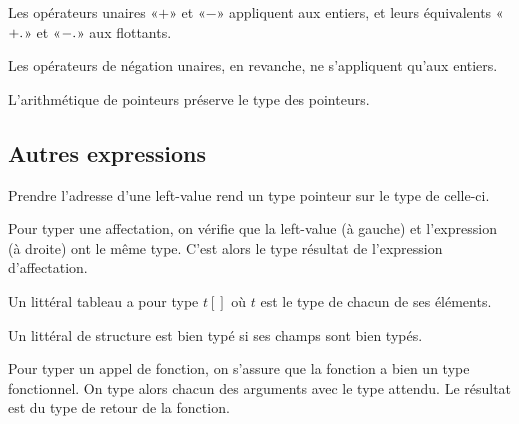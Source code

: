 Les opérateurs unaires «$+$» et «$-$» appliquent aux entiers, et leurs
équivalents «$\floatop{+}$» et «$\floatop{-}$» aux flottants.


Les opérateurs de négation unaires, en revanche, ne s'appliquent qu'aux
entiers.

\begin{mathpar}
\end{mathpar}

L'arithmétique de pointeurs préserve le type des pointeurs.

\begin{mathpar}
\end{mathpar}

\subsection*{Autres expressions}

Prendre l'adresse d'une left-value rend un type pointeur sur le type de
celle-ci.

\begin{mathpar}
\end{mathpar}

Pour typer une affectation, on vérifie que la left-value (à gauche) et
l'expression (à droite) ont le même type. C'est alors le type résultat de
l'expression d'affectation.

\begin{mathpar}
\end{mathpar}

Un littéral tableau a pour type $t[]$ où $t$ est le type de chacun de ses
éléments.

\begin{mathpar}
\end{mathpar}

Un littéral de structure est bien typé si ses champs sont bien typés.

\begin{mathpar}
\end{mathpar}

Pour typer un appel de fonction, on s'assure que la fonction a bien un type
fonctionnel. On type alors chacun des arguments avec le type attendu. Le
résultat est du type de retour de la fonction.

